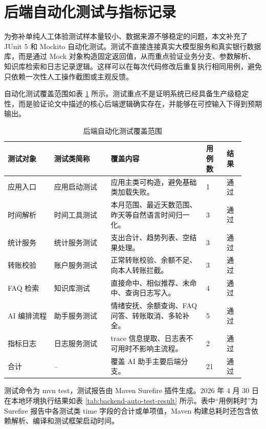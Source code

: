 \documentclass[bachelor, print]{xduthesis}
\begin{document}
\section{后端自动化测试与指标记录}

为弥补单纯人工体验测试样本量较小、数据来源不够稳定的问题，本文补充了 JUnit 5 和 Mockito 自动化测试。测试不直接连接真实大模型服务和真实银行数据库，而是通过 Mock 对象构造固定返回值，从而重点验证业务分支、参数解析、知识库检索和日志记录逻辑。这样可以在每次代码修改后重复执行相同用例，避免只依赖一次性人工操作截图或主观反馈。

自动化测试覆盖范围如表 \ref{tab:backend-auto-test-scope} 所示。测试重点不是证明系统已经具备生产级稳定性，而是验证论文中描述的核心后端逻辑确实存在，并能够在可控输入下得到预期输出。

\begin{table}[H]
    \centering
    \caption{后端自动化测试覆盖范围}
    \label{tab:backend-auto-test-scope}
    \small
    \setlength{\tabcolsep}{3pt}
    \begin{tabular}{|p{0.18\linewidth}|p{0.22\linewidth}|p{0.37\linewidth}|p{0.08\linewidth}|p{0.07\linewidth}|}
        \hline
        测试对象 & 测试类简称 & 覆盖内容 & 用例数 & 结果 \\
        \hline
        应用入口 & 应用启动测试 & 应用主类可构造，避免基础类加载失败。 & 1 & 通过 \\
        \hline
        时间解析 & 时间工具测试 & 本月范围、最近天数范围、昨天等自然语言时间归一化。 & 3 & 通过 \\
        \hline
        统计服务 & 统计服务测试 & 支出合计、趋势列表、空结果处理。 & 3 & 通过 \\
        \hline
        转账校验 & 账户服务测试 & 正常转账校验、余额不足、向本人转账拦截。 & 3 & 通过 \\
        \hline
        FAQ 检索 & 知识库测试 & 直接命中、相似推荐、未命中、查询日志写入。 & 4 & 通过 \\
        \hline
        AI 编排流程 & 助手服务测试 & 情绪安抚、余额查询、FAQ 问答、转账取消、多轮补全。 & 5 & 通过 \\
        \hline
        指标日志 & 日志服务测试 & trace 信息提取、日志表不可用时不影响主流程。 & 2 & 通过 \\
        \hline
        合计 & -- & 覆盖 AI 助手主要后端分支。 & 21 & 通过 \\
        \hline
    \end{tabular}
\end{table}

测试命令为 mvn test，测试报告由 Maven Surefire 插件生成。2026 年 4 月 30 日在本地环境执行结果如表 \ref{tab:backend-auto-test-result} 所示。表中“用例耗时”为 Surefire 报告中各测试类 time 字段的合计或单项值，Maven 构建总耗时还包含依赖解析、编译和测试框架启动时间。
\end{document}
